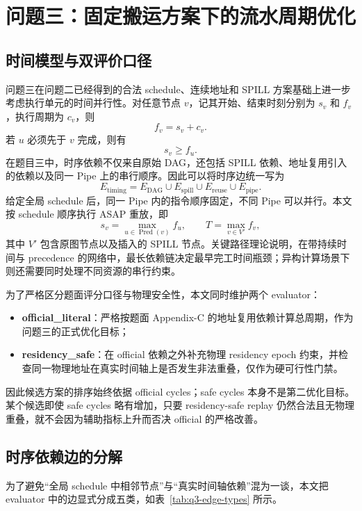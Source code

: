 \section{问题三：固定搬运方案下的流水周期优化}

\subsection{时间模型与双评价口径}

问题三在问题二已经得到的合法 schedule、连续地址和 SPILL 方案基础上进一步考虑执行单元的时间并行性。对任意节点 $v$，记其开始、结束时刻分别为 $s_v$ 和 $f_v$，执行周期为 $c_v$，则
\[
f_v=s_v+c_v.
\]
若 $u$ 必须先于 $v$ 完成，则有
\[
s_v\ge f_u.
\]
在题目三中，时序依赖不仅来自原始 DAG，还包括 SPILL 依赖、地址复用引入的依赖以及同一 Pipe 上的串行顺序。因此可以将时序边统一写为
\[
E_{\mathrm{timing}}=E_{\mathrm{DAG}}\cup E_{\mathrm{spill}}\cup E_{\mathrm{reuse}}\cup E_{\mathrm{pipe}}.
\]
给定全局 schedule 后，同一 Pipe 内的指令顺序固定，不同 Pipe 可以并行。本文按 schedule 顺序执行 ASAP 重放，即
\[
s_v=\max_{u\in\operatorname{Pred}(v)}f_u,
\qquad
T=\max_{v\in V'} f_v,
\]
其中 $V'$ 包含原图节点以及插入的 SPILL 节点。关键路径理论说明，在带持续时间与 precedence 的网络中，最长依赖链决定最早完工时间瓶颈\cite{kelley1961critical}；异构计算场景下则还需要同时处理不同资源的串行约束\cite{topcuoglu2002heft}。

为了严格区分题面评分口径与物理安全性，本文同时维护两个 evaluator：
\begin{itemize}
    \item \textbf{official\_literal}：严格按题面 Appendix-C 的地址复用依赖计算总周期，作为问题三的正式优化目标；
    \item \textbf{residency\_safe}：在 official 依赖之外补充物理 residency epoch 约束，并检查同一物理地址在真实时间轴上是否发生非法重叠，仅作为硬可行性门禁。
\end{itemize}
因此候选方案的排序始终依据 official cycles；safe cycles 本身不是第二优化目标。某个候选即使 safe cycles 略有增加，只要 residency-safe replay 仍然合法且无物理重叠，就不会因为辅助指标上升而否决 official 的严格改善。

\subsection{时序依赖边的分解}

为了避免“全局 schedule 中相邻节点”与“真实时间轴依赖”混为一谈，本文把 evaluator 中的边显式分成五类，如表~\ref{tab:q3-edge-types} 所示。

